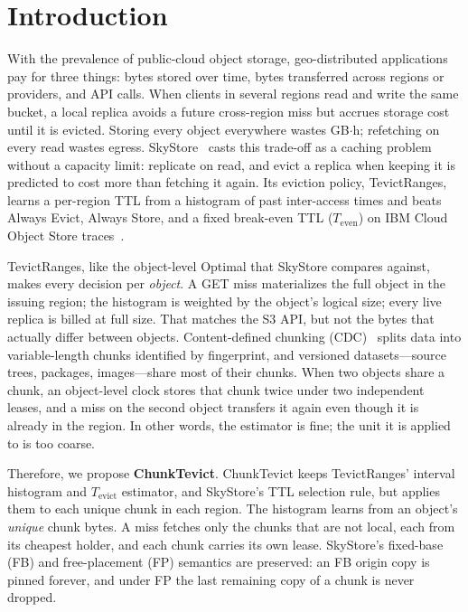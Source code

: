 \section{Introduction}
\label{sec:intro}

With the prevalence of public-cloud object storage, geo-distributed applications pay for three things: bytes stored over time, bytes transferred across regions or providers, and {API} calls.
When clients in several regions read and write the same bucket, a local replica avoids a future cross-region miss but accrues storage cost until it is evicted.
Storing every object everywhere wastes {GB}$\cdot$h; refetching on every read wastes egress.
SkyStore~\cite{skystore2025} casts this trade-off as a caching problem without a capacity limit: replicate on read, and evict a replica when keeping it is predicted to cost more than fetching it again.
Its eviction policy, TevictRanges, learns a per-region {TTL} from a histogram of past inter-access times and beats Always Evict, Always Store, and a fixed break-even {TTL} ($T_{\mathrm{even}}$) on {IBM} Cloud Object Store traces~\cite{snia_ibm2019}.

TevictRanges, like the object-level Optimal that SkyStore compares against, makes every decision per \emph{object}.
A {GET} miss materializes the full object in the issuing region; the histogram is weighted by the object's logical size; every live replica is billed at full size.
That matches the {S3} {API}, but not the bytes that actually differ between objects.
Content-defined chunking ({CDC})~\cite{lbfs2001,rabin1981} splits data into variable-length chunks identified by fingerprint, and versioned datasets---source trees, packages, images---share most of their chunks.
When two objects share a chunk, an object-level clock stores that chunk twice under two independent leases, and a miss on the second object transfers it again even though it is already in the region.
In other words, the estimator is fine; the unit it is applied to is too coarse.

Therefore, we propose \textbf{ChunkTevict}.
ChunkTevict keeps TevictRanges' interval histogram and $T_{\mathrm{evict}}$ estimator, and SkyStore's {TTL} selection rule, but applies them to each unique chunk in each region.
The histogram learns from an object's \emph{unique} chunk bytes.
A miss fetches only the chunks that are not local, each from its cheapest holder, and each chunk carries its own lease.
SkyStore's fixed-base ({FB}) and free-placement ({FP}) semantics are preserved: an {FB} origin copy is pinned forever, and under {FP} the last remaining copy of a chunk is never dropped.

